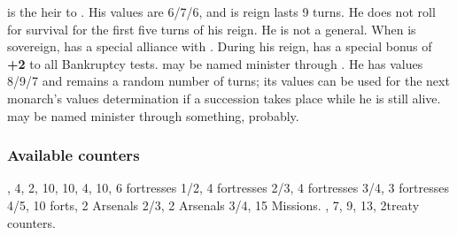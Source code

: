  is the heir to . His values are 6/7/6, and is reign lasts 9 turns. He does not roll
for survival for the first five turns of his reign. He is not a general.
\bparag When  is sovereign, \HAB has a special
alliance with \SPA. %
\bparag During his reign, \HAB has a special bonus of {\bf +2} to all
Bankruptcy tests.
 may be named minister through
. He has values 8/9/7 and remains a random number
of turns; its values can be used for the next monarch's values
determination if a succession takes place while he is still alive.
 may be named minister through
something, probably.


\subsubsection{Available counters}
\ARMY, 4\FLEET, 2\corsaire, 10\LDND, 10\LD, 4\NTD,
10\LDENDE, 6 fortresses 1/2, 4 fortresses 2/3, 4 fortresses 3/4, 3
fortresses 4/5, 10 forts, 2 Arsenals 2/3, 2 Arsenals 3/4, 15 Missions.
\COL, 7\TP, 9\MNU, 13\TradeFLEET, 2\ROTW treaty
counters.

